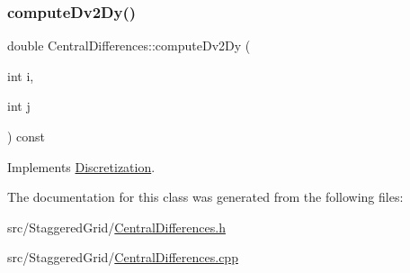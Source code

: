 \subsubsection{\texorpdfstring{computeDv2Dy()}{computeDv2Dy()}}
{\footnotesize\ttfamily double Central\+Differences\+::compute\+Dv2\+Dy (\begin{DoxyParamCaption}\item[{int}]{i,  }\item[{int}]{j }\end{DoxyParamCaption}) const\hspace{0.3cm}{\ttfamily [virtual]}}



Implements \mbox{\hyperlink{classDiscretization_a69ba136ab7f8c09d805afca159cab428}{Discretization}}.



The documentation for this class was generated from the following files\+:\begin{DoxyCompactItemize}
\item 
src/\+Staggered\+Grid/\mbox{\hyperlink{CentralDifferences_8h}{Central\+Differences.\+h}}\item 
src/\+Staggered\+Grid/\mbox{\hyperlink{CentralDifferences_8cpp}{Central\+Differences.\+cpp}}\end{DoxyCompactItemize}

